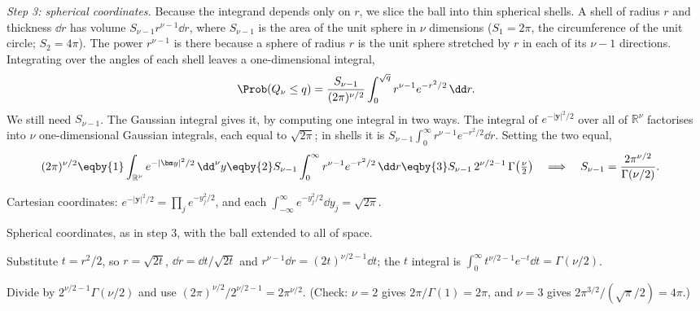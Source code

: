 \emph{Step 3: spherical coordinates.} Because the integrand depends only on $r$, we slice the ball into thin spherical shells. A shell of radius $r$ and thickness $\dd r$ has volume $S_{\nu-1}r^{\nu-1}\dd r$, where $S_{\nu-1}$ is the area of the unit sphere in $\nu$ dimensions ($S_1=2\pi$, the circumference of the unit circle; $S_2=4\pi$). The power $r^{\nu-1}$ is there because a sphere of radius $r$ is the unit sphere stretched by $r$ in each of its $\nu-1$ directions. Integrating over the angles of each shell leaves a one-dimensional integral,
\begin{equation}
  \Prob(Q_\nu\le q)=\frac{S_{\nu-1}}{(2\pi)^{\nu/2}}\int_0^{\sqrt q}r^{\nu-1}e^{-r^2/2}\,\dd r .
  \label{2b:eq:chi2-ball}
\end{equation}
We still need $S_{\nu-1}$. The Gaussian integral gives it, by computing one integral in two ways. The integral of $e^{-|\bm y|^2/2}$ over all of $\mathbb R^\nu$ factorises into $\nu$ one-dimensional Gaussian integrals, each equal to $\sqrt{2\pi}$; in shells it is $S_{\nu-1}\int_0^\infty r^{\nu-1}e^{-r^2/2}\dd r$. Setting the two equal,
\begin{align}
  (2\pi)^{\nu/2}
  &\eqby{1} \int_{\mathbb R^\nu}e^{-|\bm y|^2/2}\,\dd^\nu y
   \eqby{2} S_{\nu-1}\int_0^\infty r^{\nu-1}e^{-r^2/2}\,\dd r
   \eqby{3} S_{\nu-1}\,2^{\nu/2-1}\,\Gamma\bigl(\tfrac\nu2\bigr)
  \quad\Longrightarrow\quad S_{\nu-1}=\frac{2\pi^{\nu/2}}{\Gamma(\nu/2)} .
  \label{2b:eq:sphere-area}
\end{align}
\begin{explain}
  \item Cartesian coordinates: $e^{-|\bm y|^2/2}=\prod_je^{-y_j^2/2}$, and each $\int_{-\infty}^\infty e^{-y_j^2/2}\dd y_j=\sqrt{2\pi}$.
  \item Spherical coordinates, as in step 3, with the ball extended to all of space.
  \item Substitute $t=r^2/2$, so $r=\sqrt{2t}$, $\dd r=\dd t/\sqrt{2t}$ and $r^{\nu-1}\dd r=(2t)^{\nu/2-1}\dd t$; the $t$ integral is $\int_0^\infty t^{\nu/2-1}e^{-t}\dd t=\Gamma(\nu/2)$.
\end{explain}
Divide by $2^{\nu/2-1}\Gamma(\nu/2)$ and use $(2\pi)^{\nu/2}/2^{\nu/2-1}=2\pi^{\nu/2}$. (Check: $\nu=2$ gives $2\pi/\Gamma(1)=2\pi$, and $\nu=3$ gives $2\pi^{3/2}/(\sqrt\pi/2)=4\pi$.)

